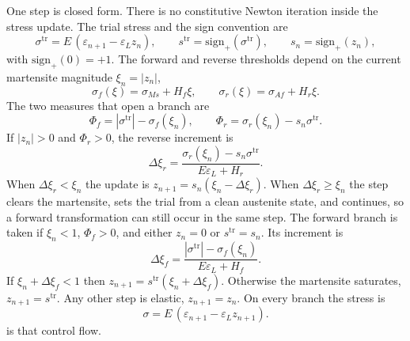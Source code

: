 \documentclass[10pt,a4paper]{article}
\begin{document}
One step is closed form. There is no constitutive Newton iteration inside the stress update. The trial stress and the sign convention are
\begin{equation}
  \label{eq:trial}
  \sigma^{\mathrm{tr}}=E\,(\varepsilon_{n+1}-\varepsilon_L z_n),
  \qquad
  s^{\mathrm{tr}}=\mathrm{sign}_{+}(\sigma^{\mathrm{tr}}),
  \qquad
  s_n=\mathrm{sign}_{+}(z_n),
\end{equation}
with $\mathrm{sign}_{+}(0)=+1$. The forward and reverse thresholds depend on the current martensite magnitude $\xi_n=|z_n|$,
\begin{equation}
  \sigma_f(\xi)=\sigma_{Ms}+H_f\xi,
  \qquad
  \sigma_r(\xi)=\sigma_{Af}+H_r\xi.
\end{equation}
The two measures that open a branch are
\begin{equation}
  \Phi_f=|\sigma^{\mathrm{tr}}|-\sigma_f(\xi_n),
  \qquad
  \Phi_r=\sigma_r(\xi_n)-s_n\sigma^{\mathrm{tr}}.
\end{equation}
If $|z_n|>0$ and $\Phi_r>0$, the reverse increment is
\begin{equation}
  \label{eq:dr}
  \Delta\xi_r=\frac{\sigma_r(\xi_n)-s_n\sigma^{\mathrm{tr}}}{E\varepsilon_L+H_r}.
\end{equation}
When $\Delta\xi_r<\xi_n$ the update is $z_{n+1}=s_n(\xi_n-\Delta\xi_r)$. When $\Delta\xi_r\ge\xi_n$ the step clears the martensite, sets the trial from a clean austenite state, and continues, so a forward transformation can still occur in the same step. The forward branch is taken if $\xi_n<1$, $\Phi_f>0$, and either $z_n=0$ or $s^{\mathrm{tr}}=s_n$. Its increment is
\begin{equation}
  \label{eq:df}
  \Delta\xi_f=\frac{|\sigma^{\mathrm{tr}}|-\sigma_f(\xi_n)}{E\varepsilon_L+H_f}.
\end{equation}
If $\xi_n+\Delta\xi_f<1$ then $z_{n+1}=s^{\mathrm{tr}}(\xi_n+\Delta\xi_f)$. Otherwise the martensite saturates, $z_{n+1}=s^{\mathrm{tr}}$. Any other step is elastic, $z_{n+1}=z_n$. On every branch the stress is
\begin{equation}
  \label{eq:stress}
  \sigma=E\,(\varepsilon_{n+1}-\varepsilon_L z_{n+1}).
\end{equation}
 is that control flow.
\end{document}
